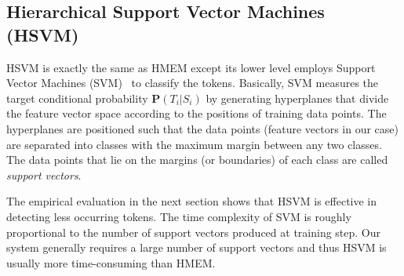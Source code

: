 \subsection{Hierarchical Support Vector Machines (HSVM)}\label{subsec:hsvm}

HSVM is exactly the same as HMEM except its lower
level employs Support Vector Machines (SVM)~\cite{CC01a} to classify
the tokens. 
Basically, SVM measures the target conditional probability $\mathbf{P}(T_i|S_i)$ 
by generating hyperplanes that divide the feature vector space according to the
positions of training data points. The hyperplanes are positioned such that the
data points (feature vectors in our case) are separated into classes with
the maximum margin between any two classes. The data points that lie on
the margins (or boundaries) of each class are called {\em support vectors}. 

The empirical evaluation in the next section shows that HSVM is effective
in detecting less occurring tokens. The time complexity of SVM 
is roughly proportional to the number of support vectors produced at training
step. Our system generally requires a large number of support vectors 
and thus HSVM is usually more time-consuming than HMEM.

